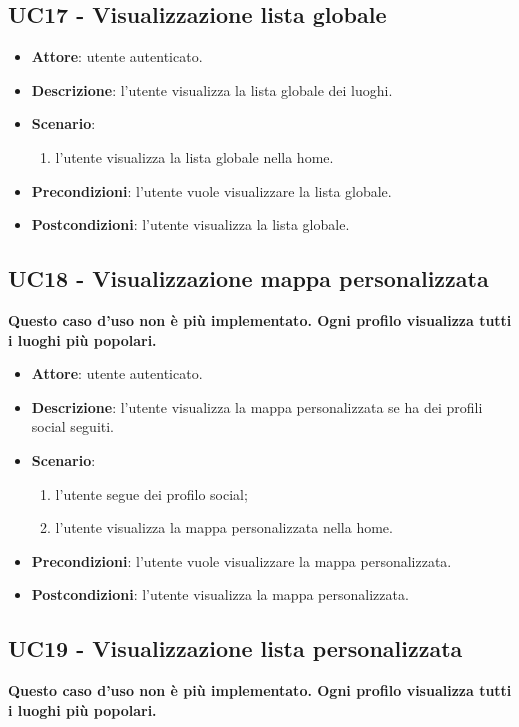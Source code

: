 \subsection{UC17 - Visualizzazione lista globale}
\begin{itemize}
    \item \textbf{Attore}: utente autenticato.
    \item \textbf{Descrizione}: l'utente visualizza la lista globale dei luoghi.
    \item \textbf{Scenario}:
    \begin{enumerate}
        \item l'utente visualizza la lista globale nella home.
    \end{enumerate}

    \item \textbf{Precondizioni}: l'utente vuole visualizzare la lista globale.
    \item \textbf{Postcondizioni}: l'utente visualizza la lista globale.
\end{itemize}

\subsection{UC18 - Visualizzazione mappa personalizzata}
\textbf{Questo caso d'uso non è più implementato. Ogni profilo visualizza tutti i luoghi più popolari.}

\begin{itemize}
    \item \textbf{Attore}: utente autenticato.
    \item \textbf{Descrizione}: l'utente visualizza la mappa personalizzata se ha dei profili social seguiti.
    \item \textbf{Scenario}:
    \begin{enumerate}
        \item l'utente segue dei profilo social;
        \item l'utente visualizza la mappa personalizzata nella home.
    \end{enumerate}

    \item \textbf{Precondizioni}: l'utente vuole visualizzare la mappa personalizzata.
    \item \textbf{Postcondizioni}: l'utente visualizza la mappa personalizzata.
\end{itemize}

\subsection{UC19 - Visualizzazione lista personalizzata}
\textbf{Questo caso d'uso non è più implementato. Ogni profilo visualizza tutti i luoghi più popolari.}

